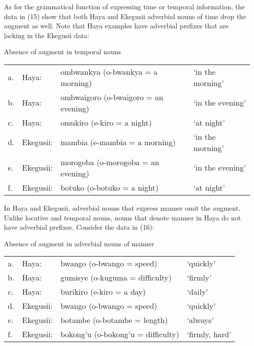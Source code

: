 \documentclass[output=paper]{langscibook}
\begin{document}
	As for the grammatical function of expressing time or temporal information, the data in (15) show that both Haya and Ekegusii adverbial nouns of time drop the augment as well. Note that Haya examples have adverbial prefixes that are lacking in the Ekegusii data:

\begin{exe}
\ex Absence of augment in temporal nouns \\
\label{hayagusii15}
\begin{tabular}{llll}
 a.	& Haya: 	&	ombwankya (o-bwankya = a morning) &	‘in the morning’\\
b. &	Haya: &		ombwaigoro (o-bwaigoro = an evening)&	‘in the evening’\\
c. &	Haya: 	&	omukiro (e-kiro = a night)		&	‘at night’\\
d. &	Ekegusii: &	mambia (e-mambia = a morning)	&	‘in the morning’\\
e. &	Ekegusii: &	morogoba (o-morogoba = an evening)&	‘in the evening’\\
f. &	Ekegusii: &	botuko (o-botuko = a night) 		&	‘at night’\\
\end{tabular}
\end{exe}

In Haya and Ekegusii, adverbial nouns that express manner omit the augment. Unlike locative and temporal nouns, nouns that denote manner in Haya do not have adverbial prefixes. Consider the data in (16):

\begin{exe}
\ex Absence of augment in adverbial nouns of manner \\
\label{hayagusii15}
\begin{tabular}{llll}
   a. &	Haya: 	&	bwango (o-bwango = speed)	&	‘quickly’	\\	
b. &	Haya: 	&	gumisye (o-kuguma = difficulty)	& ‘firmly’	\\
c. &	Haya: 	&	burikiro (e-kiro = a day)	&	‘daily’\\
d. &	Ekegusii: & 	bwango (o-bwango = speed)	&	‘quickly’\\
e. &	Ekegusii: &	botambe (o-botambe = length) &	‘always’\\
f. &	Ekegusii: &	bokong’u (o-bokong’u = difficulty) &	‘firmly, hard’\\
\end{tabular}

\end{exe}
\end{document}
